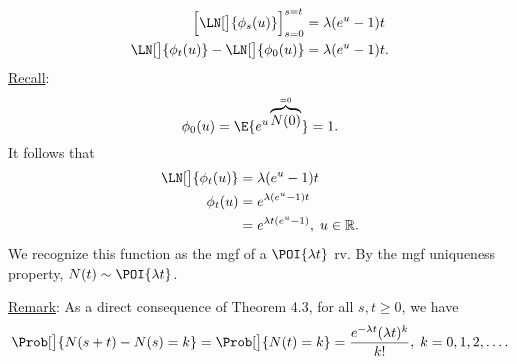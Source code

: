 \begin{Result}
\begin{align*}
        \Bigl[\LN[\big]{\phi_s(u)}\Bigr]_{s=0}^{s=t}               & =\lambda (e^u-1)t                                                                               \\
        \LN[\big]{\phi_t(u)}-\LN[\big]{\phi_0(u)}                  & =\lambda (e^u-1)t.
    \end{align*}
    \underline{Recall}:
    \[ \phi_0(u)=\E{e^{u \overbrace{N(0)}^{=0}}}=1. \]
    It follows that
    \begin{align*}
        \LN[\big]{\phi_t(u)} & =\lambda(e^u-1)t                         \\
        \phi_t(u)            & =e^{\lambda(e^u-1)t}                     \\
                             & =e^{\lambda t(e^u-1)},\; u\in\mathbb{R}.
    \end{align*}
    We recognize this function as the mgf of a $ \POI{\lambda t} $ rv.
    By the mgf uniqueness property, $ N(t)\sim \POI{\lambda t} $.
\end{Result}
\underline{Remark}: As a direct consequence of Theorem 4.3, for all $ s,t\ge 0 $, we have
\[ \Prob[\big]{N(s+t)-N(s)=k}=\Prob[\big]{N(t)=k}=\frac{e^{-\lambda t}(\lambda t)^k}{k!},\; k=0,1,2,\ldots. \]
